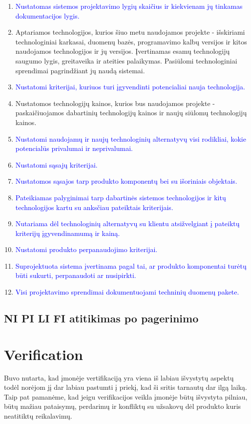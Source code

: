 \documentclass{VUMIFPSkursinis}
\begin{document}
	\begin{enumerate}
	\item{\textcolor{blue}{Nustatomas sistemos projektavimo lygių skaičius ir kiekvienam jų tinkamas dokumentacijos lygis.}}
		\item{
			Aptariamos technologijos, kurios šiuo metu naudojamos projekte - išskiriami technologiniai karkasai, duomenų bazės, programavimo kalbų versijos ir kitos naudojamos technologijos ir jų versijos.
			Įvertinamas esamų technologijų saugumo lygis, greitaveika ir ateities palaikymas.
			Pasiūlomi technologiniai sprendimai pagrindžiant jų naudą sistemai.
		}
		\item{\textcolor{blue}{Nustatomi kriterijai, kuriuos turi įgyvendinti potencialiai nauja technologija.}}
		\item{Nustatomos technologijų kainos, kurios bus naudojamos projekte - paskaičiuojamos dabartinių technologijų kainos ir naujų siūlomų technologijų kainos.}
		\item{\textcolor{blue}{Nustatomi naudojamų ir naujų technologinių alternatyvų visi rodikliai, kokie potencialūs privalumai ir neprivalumai.}}
		\item{\textcolor{blue}{Nustatomi sąsajų kriterijai.}}
		\item{\textcolor{blue}{Nustatomos sąsajos tarp produkto komponentų bei su išoriniais objektais.}}
		\item{\textcolor{blue}{Pateikiamas palyginimai tarp dabartinės sistemos technologijos ir kitų technologijos kartu su anksčiau pateiktais kriterijais.}}
		\item{\textcolor{blue}{Nutariama dėl technologinių alternatyvų su klientu atsižvelgiant į pateiktų kriterijų įgyvendinamumą ir kainą.}}
		\item{\textcolor{blue}{Nustatomi produkto perpanaudojimo kriterijai.}}
		\item{\textcolor{blue}{Suprojektuota sistema įvertinama pagal tai, ar produkto komponentai turėtų būti sukurti, perpanaudoti ar nusipirkti.}}
		\item{\textcolor{blue}{Visi projektavimo sprendimai dokumentuojami techninių duomenų pakete.}}
	\end{enumerate}
		\subsection{NI PI LI FI atitikimas po pagerinimo}
		
		

	\section{Verification}
		Buvo nutarta, kad įmonėje vertifikaciją yra viena iš labiau išvystytų aspektų todėl norėjom jį dar labiau pastumti į priekį, kad ši sritis tarnautų dar ilgą laiką. 
		Taip pat pamanėme, kad jeigu verifikacijos veikla įmonėje būtų išvystyta pilniau, būtų mažiau pataisymų, perdarimų ir konfliktų su užsakovų dėl produkto kuris neatitiktų reikalavimų.
\end{document}

